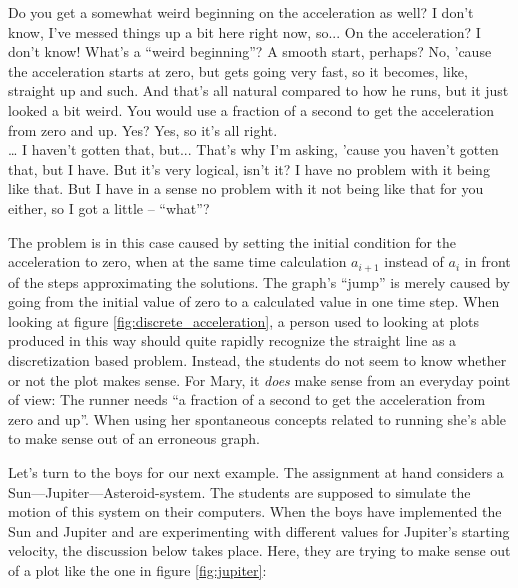\documentclass[aps,prb,floatfix,twocolumn,twoside,english]{revtex4-1}
\begin{document}
\begin{dialogue}
\small
{} Do you get a somewhat weird beginning on the acceleration as well?
 I don't know, I've messed things up a bit here right now, so... On the acceleration? I don't know!
 What's a ``weird beginning''? 
 A smooth start, perhaps? 
 No, 'cause the acceleration starts at zero, but gets going very fast, so it becomes, like, straight up and such. And that's all natural compared to how he runs, but it just looked a bit weird. You would use a fraction of a second to get the acceleration from zero and up.
 Yes? 
 Yes, so it's all right.
\\ \dots
{} I haven't gotten that, but... 
 That's why I'm asking, 'cause you haven't gotten that, but I have.
 But it's very logical, isn't it?
 I have no problem with it being like that. But I have in a sense no problem with it not being like that for you either, so I got a little -- ``what''?
\end{dialogue}

The problem is in this case caused by setting the initial condition for the acceleration to zero, when at the same time calculation $a_{i+1}$ instead of $a_{i}$ in front of the steps approximating the solutions. The graph's ``jump'' is merely caused by going from the initial value of zero to a calculated value in one time step. When looking at figure \ref{fig:discrete_acceleration}, a person used to looking at plots produced in this way should quite rapidly recognize the straight line as a discretization based problem. Instead, the students do not seem to know whether or not the plot makes sense. For Mary, it \textit{does} make sense from an everyday point of view: The runner needs ``a fraction of a second to get the acceleration from zero and up''. When using her spontaneous concepts related to running she's able to make sense out of an erroneous graph.

Let's turn to the boys for our next example. The assignment at hand considers a Sun---Jupiter---Asteroid-system. The students are supposed to simulate the motion of this system on their computers. When the boys have implemented the Sun and Jupiter and are experimenting with different values for Jupiter's starting velocity, the discussion below takes place. Here, they are trying to make sense out of a plot like the one in figure \ref{fig:jupiter}:
\end{document}
